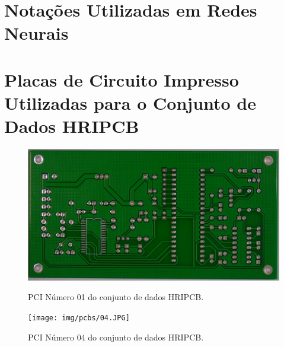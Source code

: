 \chapter{Notações Utilizadas em Redes Neurais} \label{apendice:notacao}


\chapter{Placas de Circuito Impresso Utilizadas para o Conjunto de Dados HRIPCB} \label{apendice:hripcb-pcbs}

\begin{figure}[!h] %
  \centering
  \caption{PCI Número 01 do conjunto de dados HRIPCB.}
  \includegraphics[scale=0.11]{img/pcbs/01.JPG}
  \label{fig:ap-pcbs-1}
\end{figure}

\begin{figure}[!h] %
  \centering
  \caption{PCI Número 04 do conjunto de dados HRIPCB.}
  \texttt{[image: img/pcbs/04.JPG]}
  \label{fig:ap-pcbs-4}
\end{figure}

